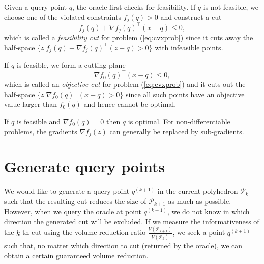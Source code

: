 \documentclass[9pt]{extarticle}
\newcommand{\eat}[1]{}
\begin{document}
Given a query point $q$, the oracle first checks for feasibility.
If $q$ is not feasible, we choose one of the violated constraints $f_j(q) > 0$ and construct a cut
\begin{equation*}
f_j(q) + \nabla f_j(q)^\top (x - q) \le 0,
\end{equation*}
which is called a \textit{feasibility cut} for problem (\ref{eq:cvxprob}) since it cuts away the half-space 
$\{z | f_j(q) + \nabla f_j(q)^\top (z - q) > 0 \}$ with infeasible points.

\eat{
Proof of infeasibility.
}

\eat{
Multiple cuts for more than one violated constraints.
}
If $q$ is feasible, we form a cutting-plane
\begin{equation*}
\nabla f_0(q)^\top (x - q) \le 0,
\end{equation*}
which is called an \textit{objective cut} for problem (\ref{eq:cvxprob}) and it cuts out the half-space
$\{z | \nabla f_0(q)^\top (x - q) > 0 \}$
since all such points have an objective value larger than $f_0(q)$ and hence cannot be optimal.

\eat{
Proof of non-optimal.
}

If $q$ is feasible and $\nabla f_0(q) = 0$ then $q$ is optimal.
For non-differentiable problems, the gradients $\nabla f_j(z)$ can generally be replaced by sub-gradients.


\section{Generate query points}
We would like to generate a query point $q^{(k+1)}$ in the current polyhedron $\mathcal{P}_{k}$ such that 
the resulting cut reduces the size of $\mathcal{P}_{k+1}$ as much as possible.
However, when we query the oracle at point $q^{(k+1)}$, we do not know in which direction the generated cut will be excluded.
If we measure the informativeness of the $k$-th cut using the volume reduction ratio $\frac{V(\mathcal{P}_{k+1})}{V(\mathcal{P}_{k})}$,
we seek a point $q^{(k+1)}$ such that, no matter which direction to cut (returned by the oracle), we can obtain a certain guaranteed volume reduction.
\end{document}
